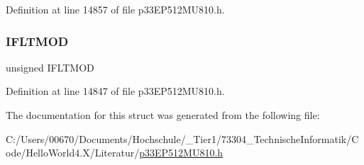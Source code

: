 Definition at line 14857 of file p33\+E\+P512\+M\+U810.\+h.

\mbox{\label{structtag_f_c_l_c_o_n4_b_i_t_s_a4573eed251d96a98a6b5ba1c7cc30451}} 
\subsubsection{\texorpdfstring{I\+F\+L\+T\+M\+OD}{IFLTMOD}}
{\footnotesize\ttfamily unsigned I\+F\+L\+T\+M\+OD}



Definition at line 14847 of file p33\+E\+P512\+M\+U810.\+h.



The documentation for this struct was generated from the following file\+:\begin{DoxyCompactItemize}
\item 
C\+:/\+Users/00670/\+Documents/\+Hochschule/\+\_\+\+Tier1/73304\+\_\+\+Technische\+Informatik/\+Code/\+Hello\+World4.\+X/\+Literatur/\hyperlink{p33_e_p512_m_u810_8h}{p33\+E\+P512\+M\+U810.\+h}\end{DoxyCompactItemize}
